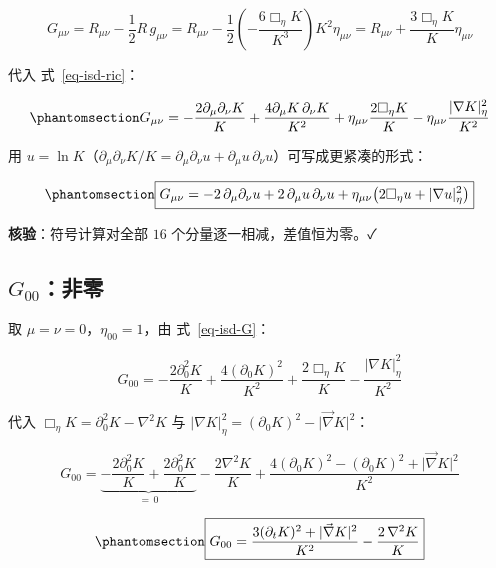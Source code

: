 \documentclass[
  chinese,
  a4paper,
  UTF8,
  12pt,
  oneside,
  openany]{ctexbook}
\theoremstyle{plain}
\theoremstyle{plain}
\theoremstyle{plain}
\theoremstyle{definition}
\theoremstyle{plain}
\theoremstyle{plain}
\theoremstyle{remark}
\begin{document}
\[
G_{\mu\nu}=R_{\mu\nu}-\frac{1}{2}R\,g_{\mu\nu}
=R_{\mu\nu}-\frac{1}{2}\left(-\frac{6\Box_\eta K}{K^{3}}\right)K^{2}\eta_{\mu\nu}
=R_{\mu\nu}+\frac{3\Box_\eta K}{K}\eta_{\mu\nu}
\]

代入 式~\ref{eq-isd-ric}：

\begin{equation}\protect\phantomsection\label{eq-isd-G}{
G_{\mu\nu}=
-\frac{2\partial_\mu\partial_{\nu}K}{K}
+\frac{4\partial_{\mu}K\,\partial_{\nu}K}{K^{2}}
+\eta_{\mu\nu}\frac{2\Box_\eta K}{K}
-\eta_{\mu\nu}\frac{\lvert\nabla K\rvert^{2}_{\eta}}{K^{2}}
}\end{equation}

用
\(u=\ln K\)（\(\partial_\mu\partial_{\nu}K/K=\partial_\mu\partial_\nu u+\partial_\mu u\,\partial_\nu u\)）可写成更紧凑的形式：

\begin{equation}\protect\phantomsection\label{eq-isd-G-u}{
\boxed{G_{\mu\nu}=
-2\,\partial_\mu\partial_\nu u
+2\,\partial_\mu u\,\partial_\nu u
+\eta_{\mu\nu}\bigl(2\Box_\eta u+\lvert\nabla u\rvert^{2}_{\eta}\bigr)}
}\end{equation}

\textbf{核验}：符号计算对全部 \(16\) 个分量逐一相减，差值恒为零。✓

\subsection{\texorpdfstring{\(G_{00}\)：非零}{G\_\{00\}：非零}}\label{g_00ux975eux96f6}

取 \(\mu=\nu=0\)，\(\eta_{00}=1\)，由 式~\ref{eq-isd-G}：

\[
G_{00}=
-\frac{2\partial_0^{2}K}{K}
+\frac{4(\partial_0K)^{2}}{K^{2}}
+\frac{2\Box_\eta K}{K}
-\frac{\lvert\nabla K\rvert^{2}_{\eta}}{K^{2}}
\]

代入 \(\Box_\eta K=\partial_0^{2}K-\nabla^{2}K\) 与
\(\lvert\nabla K\rvert^{2}_{\eta}=(\partial_0K)^{2}-\lvert\vec\nabla K\rvert^{2}\)：

\[
G_{00}=
\underbrace{-\frac{2\partial_0^{2}K}{K}+\frac{2\partial_0^{2}K}{K}}_{=\,0}
-\frac{2\nabla^{2}K}{K}
+\frac{4(\partial_0K)^{2}-(\partial_0K)^{2}+\lvert\vec\nabla K\rvert^{2}}{K^{2}}
\]

\begin{equation}\protect\phantomsection\label{eq-isd-G00}{
\boxed{G_{00}=
\frac{3(\partial_tK)^{2}+\lvert\vec\nabla K\rvert^{2}}{K^{2}}
-\frac{2\,\nabla^{2}K}{K}}
}\end{equation}
\end{document}
